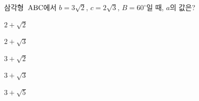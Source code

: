 삼각형~$\mathrm{ABC}$에서 $b=3\sqrt{2}$, $c=2\sqrt{3}$, $B=60^\circ$일 때, $a$의 값은?
\begin{choices32}{\rule[-3ex]{0pt}{8ex}$2+\sqrt{2}$}{\rule[-3ex]{0pt}{8ex}$2+\sqrt{3}$}{\rule[-3ex]{0pt}{8ex}$3+\sqrt{2}$}{\rule[-3ex]{0pt}{8ex}$3+\sqrt{3}$}{\rule[-3ex]{0pt}{8ex}$3+\sqrt{5}$}\end{choices32}
